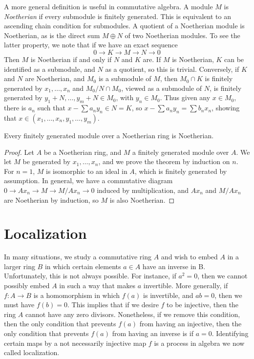 A more general definition is useful in commutative algebra. A module $M$ is \emph{Noetherian} if every submodule is finitely generated. This is equivalent to an ascending chain condition for submodules. A quotient of a Noetherian module is Noetherian, as is the direct sum $M \oplus N$ of two Noetherian modules. To see the latter property, we note that if we have an exact sequence
%
\[ 0 \to K \to M \to N \to 0 \]
%
Then $M$ is Noetherian if and only if $N$ and $K$ are. If $M$ is Noetherian, $K$ can be identified as a submodule, and $N$ as a quotient, so this is trivial. Conversely, if $K$ and $N$ are Noetherian, and $M_0$ is a submodule of $M$, then $M_0 \cap K$ is finitely generated by $x_1, \dots, x_n$ and $M_0/N \cap M_0$, viewed as a submodule of $N$, is finitely generated by $y_1 + N, \dots, y_m + N \in M_0$, with $y_n \in M_0$. Thus given any $x \in M_0$, there is $a_n$ such that $x - \sum a_ny_n \in N = K$, so $x - \sum a_ny_n = \sum b_nx_n$, showing that $x \in (x_1, \dots, x_n, y_1, \dots, y_m)$.

\begin{theorem}
    Every finitely generated module over a Noetherian ring is Noetherian.
\end{theorem}
\begin{proof}
    Let $A$ be a Noetherian ring, and $M$ a finitely generated module over $A$. We let $M$ be generated by $x_1, \dots, x_n$, and we prove the theorem by induction on $n$. For $n = 1$, $M$ is isomorphic to an ideal in $A$, which is finitely generated by assumption. In general, we have a commutative diagram $0 \to Ax_n \to M \to M/Ax_n \to 0$ induced by multiplication, and $Ax_n$ and $M/Ax_n$ are Noetherian by induction, so $M$ is also Noetherian.
\end{proof}

\chapter{Localization}

In many situations, we study a commutative ring $A$ and wish to embed $A$ in a larger ring $B$ in which certain elements $a \in A$ have an inverse in B. Unfortunately, this is not always possible. For instance, if $a^2 = 0$, then we cannot possibly embed $A$ in such a way that makes $a$ invertible. More generally, if $f:A \to B$ is a homomorphism in which $f(a)$ is invertible, and $ab = 0$, then we must have $f(b) = 0$. This implies that if we desire $f$ to be injective, then the ring $A$ cannot have any zero divisors. Nonetheless, if we remove this condition, then the only condition that prevents $f(a)$ from having an injective, then the only condition that prevents $f(a)$ from having an inverse is if $a = 0$. Identifying certain maps by a not necessarily injective map $f$ is a process in algebra we now called localization.

